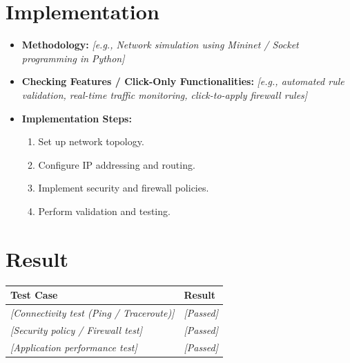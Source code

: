 \documentclass[11pt,a4paper]{article}
\begin{document}
\section{Implementation}
\begin{itemize}
  \item \textbf{Methodology:} \textit{[e.g., Network simulation using Mininet / Socket programming in Python]}
  \item \textbf{Checking Features / Click-Only Functionalities:} \textit{[e.g., automated rule validation, real-time traffic monitoring, click-to-apply firewall rules]}
  \item \textbf{Implementation Steps:}
    \begin{enumerate}
      \item Set up network topology.
      \item Configure IP addressing and routing.
      \item Implement security and firewall policies.
      \item Perform validation and testing.
    \end{enumerate}
\end{itemize}

\section{Result}
\begin{tabularx}{\linewidth}{X l}
  \toprule
  \textbf{Test Case} & \textbf{Result} \\
  \midrule
  \textit{[Connectivity test (Ping / Traceroute)]} & \textit{[Passed]} \\
  \textit{[Security policy / Firewall test]} & \textit{[Passed]} \\
  \textit{[Application performance test]} & \textit{[Passed]} \\
  \bottomrule
\end{tabularx}
\end{document}
